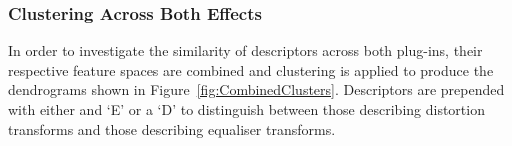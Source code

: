 		\subsubsection*{Clustering Across Both Effects}
			In order to investigate the similarity of descriptors across both plug-ins, their respective
			feature spaces are combined and clustering is applied to produce the dendrograms shown in
			Figure~\ref{fig:CombinedClusters}. Descriptors are prepended with either and `E' or a `D' to
			distinguish between those describing distortion transforms and those describing equaliser
			transforms.

			\begin{figure}[h!]
				\centering
\end{figure}
